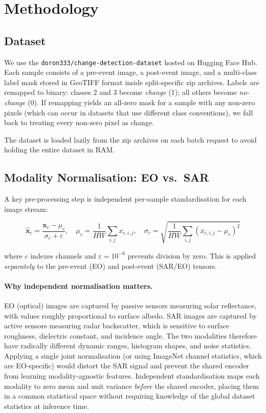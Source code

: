 \documentclass[12pt,a4paper]{article}
\begin{document}
\section{Methodology}

\subsection{Dataset}

We use the \texttt{doron333/change-detection-dataset} hosted on Hugging Face Hub.  Each
sample consists of a pre-event image, a post-event image, and a multi-class label mask
stored in GeoTIFF format inside split-specific zip archives.  Labels are remapped to
binary: classes 2 and 3 become \textit{change} (1); all others become
\textit{no-change} (0).  If remapping yields an all-zero mask for a sample with any
non-zero pixels (which can occur in datasets that use different class conventions), we
fall back to treating every non-zero pixel as change.

The dataset is loaded lazily from the zip archives on each batch request to avoid holding
the entire dataset in RAM.

\subsection{Modality Normalisation: EO vs.\ SAR}

A key pre-processing step is independent per-sample standardisation for each image stream:

\[
\hat{\mathbf{x}}_c = \frac{\mathbf{x}_c - \mu_c}{\sigma_c + \varepsilon}, \quad
\mu_c = \frac{1}{HW}\sum_{i,j} x_{c,i,j}, \quad
\sigma_c = \sqrt{\frac{1}{HW}\sum_{i,j}(x_{c,i,j}-\mu_c)^2}
\]

\noindent where $c$ indexes channels and $\varepsilon = 10^{-6}$ prevents division by
zero.  This is applied \emph{separately} to the pre-event (EO) and post-event (SAR/EO)
tensors.

\paragraph{Why independent normalisation matters.}
EO (optical) images are captured by passive sensors measuring solar reflectance, with
values roughly proportional to surface albedo.  SAR images are captured by active sensors
measuring radar backscatter, which is sensitive to surface roughness, dielectric constant,
and incidence angle.  The two modalities therefore have radically different dynamic
ranges, histogram shapes, and noise statistics.  Applying a single joint normalisation
(or using ImageNet channel statistics, which are EO-specific) would distort the SAR
signal and prevent the shared encoder from learning modality-agnostic features.
Independent standardisation maps each modality to zero mean and unit variance
\emph{before} the shared encoder, placing them in a common statistical space without
requiring knowledge of the global dataset statistics at inference time.
\end{document}
